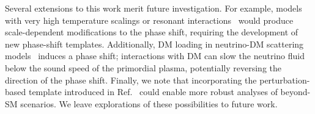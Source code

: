 Several extensions to this work merit future investigation. For example, models with very high temperature scalings or resonant interactions~\cite{Creque-Sarbinowski:2020qhz,Venzor:2023aka,Noriega:2025ulc} would produce scale-dependent modifications to the phase shift, requiring the development of new phase-shift templates. Additionally, DM loading in neutrino-DM scattering models~\cite{Ghosh:2024wva} induces a phase shift; interactions with DM can slow the neutrino fluid below the sound speed of the primordial plasma, potentially reversing the direction of the phase shift. Finally, we note that incorporating the perturbation-based template introduced in Ref.~\cite{Montefalcone:2025unv} could enable more robust analyses of beyond-SM scenarios. We leave explorations of these possibilities to future work.


